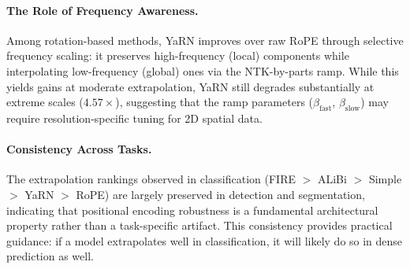 \paragraph{The Role of Frequency Awareness.}
Among rotation-based methods, YaRN improves over raw RoPE through selective frequency scaling:
it preserves high-frequency (local) components while interpolating low-frequency (global) ones
via the NTK-by-parts ramp. While this yields gains at moderate extrapolation, YaRN still degrades
substantially at extreme scales ($4.57\times$), suggesting that the ramp parameters
($\beta_{\text{fast}}$, $\beta_{\text{slow}}$) may require resolution-specific tuning for 2D spatial data.

\paragraph{Consistency Across Tasks.}
The extrapolation rankings observed in classification (FIRE $>$ ALiBi $>$ Simple $>$
YaRN $>$ RoPE) are largely preserved in detection and segmentation, indicating that
positional encoding robustness is a fundamental architectural property rather than a task-specific
artifact. This consistency provides practical guidance: if a model extrapolates well in
classification, it will likely do so in dense prediction as well.